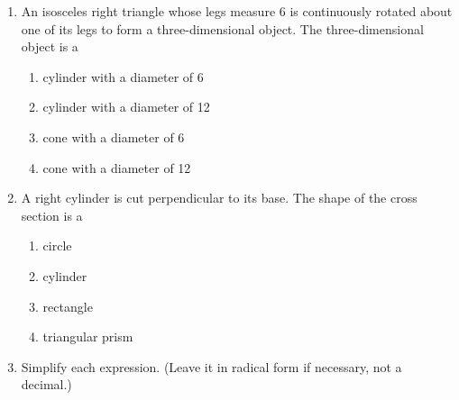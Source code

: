 \documentclass[12pt, twoside]{article}
\begin{document}
\begin{enumerate}
  \item An isosceles right triangle whose legs measure 6 is continuously rotated about one of its legs to form a three-dimensional object. The three-dimensional object is a
    \begin{enumerate}
      \item cylinder with a diameter of 6
      \item cylinder with a diameter of 12
      \item cone with a diameter of 6
      \item cone with a diameter of 12
    \end{enumerate}

  \item A right cylinder is cut perpendicular to its base. The shape of the cross section is a
    \begin{enumerate}
      \item circle
      \item cylinder
      \item rectangle
      \item triangular prism
    \end{enumerate}

    \item Simplify each expression. (Leave it in radical form if necessary, not a decimal.)
      \begin{enumerate}
      \end{enumerate}



\end{enumerate}
\end{document}
